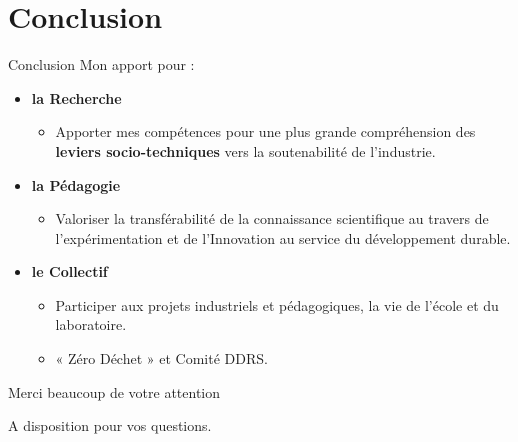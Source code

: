 \documentclass[
  11pt,
  ignorenonframetext,
  aspectratio=169,
  c]{beamer}
\providecommand{\tightlist}{%
  \setlength{\itemsep}{0pt}\setlength{\parskip}{0pt}}\usepackage{longtable,booktabs,array}
\begin{document}
\hypertarget{conclusion}{%
\section{Conclusion}\label{conclusion}}

\begin{frame}{Conclusion}
Mon apport pour :

\begin{itemize}
\item
  \textbf{la Recherche}

  \begin{itemize}
  \tightlist
  \item
    Apporter mes compétences pour une plus grande compréhension des
    \textbf{leviers socio-techniques} vers la soutenabilité de
    l'industrie.
  \end{itemize}
\item
  \textbf{la Pédagogie}

  \begin{itemize}
  \tightlist
  \item
    Valoriser la transférabilité de la connaissance scientifique au
    travers de l'expérimentation et de l'Innovation au service du
    développement durable.
  \end{itemize}
\item
  \textbf{le Collectif}

  \begin{itemize}
  \tightlist
  \item
    Participer aux projets industriels et pédagogiques, la vie de
    l'école et du laboratoire.
  \item
    « Zéro Déchet » et Comité DDRS.
  \end{itemize}
\end{itemize}
\end{frame}

\begin{frame}{Merci beaucoup de votre attention}
\protect\hypertarget{merci-beaucoup-de-votre-attention}{}
\begin{block}{A disposition pour vos questions.}
\protect\hypertarget{a-disposition-pour-vos-questions.}{}
\end{block}
\end{frame}
\end{document}
